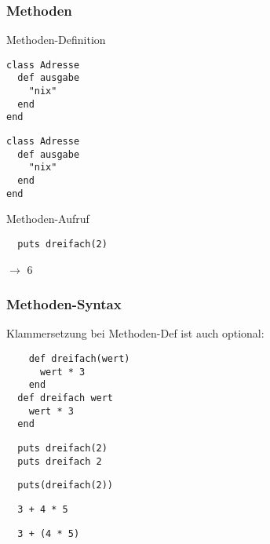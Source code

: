\documentclass{beamer}
\begin{document}
\lstset{language=Ruby}
\lstset{basicstyle=\small,numbers=none, numberstyle=\tiny, numbersep=5pt}

\begin{frame}[fragile]
  \frametitle{Methoden}

  Methoden-Definition
  \begin{lstlisting}
class Adresse  
  def ausgabe
    "nix"
  end
end
  \end{lstlisting}
  \pause
  

\begin{comment}
 , label={[name=meth-adr]above:ausgabe}
\end{comment}


  \begin{lstlisting}
class Adresse  
  def ausgabe
    "nix"
  end
end
  \end{lstlisting}
  \pause
  Methoden-Aufruf
  \begin{lstlisting}
  puts dreifach(2) 
  \end{lstlisting}
  $\longrightarrow$ 6
\end{frame}


\begin{frame}[fragile]
  \frametitle{Methoden-Syntax}
  Klammersetzung bei Methoden-Def ist auch optional:
  \begin{lstlisting}
    def dreifach(wert)
      wert * 3
    end
  def dreifach wert 
    wert * 3
  end
  \end{lstlisting}
  \pause
  \begin{lstlisting}
  puts dreifach(2) 
  puts dreifach 2 
  \end{lstlisting}
  \pause
  \begin{lstlisting}
  puts(dreifach(2)) 
  \end{lstlisting}
  
  \pause
  \begin{lstlisting}
  3 + 4 * 5 
  \end{lstlisting}
  \pause
  \begin{lstlisting}
  3 + (4 * 5)
  \end{lstlisting}
\end{frame}
\end{document}

